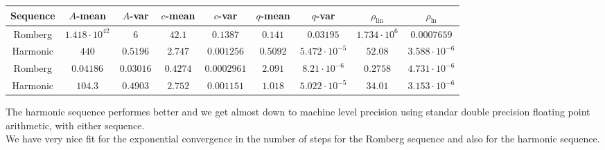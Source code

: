 \begin{table}[H]
    \centering
    \small
    \begin{tabular}{c||c|c|c|c|c|c|c|c}
Sequence & \(A\)-mean & \(A\)-var & \(c\)-mean & \(c\)-var & \(q\)-mean & \(q\)-var & \(\rho_{\operatorname{lin}}\) & \(\rho_{\ln}\)\\\hline
\rowcolor{red}
Romberg & \(1.418\cdot 10^{42}\) & \(6\) & \(42.1\) & \(0.1387\) & \(0.141\) & \(0.03195\) & \(1.734\cdot 10^6\) & \(0.0007659\) \\
\rowcolor{green}
Harmonic & \(440\) & \(0.5196\) & \(2.747\) & \(0.001256\) & \(0.5092\) & \(5.472\cdot 10^{-5}\) & \(52.08\) & \(3.588\cdot 10^{-6}\) \\
\rowcolor{green}
Romberg & \(0.04186\) & \(0.03016\) & \(0.4274\) & \(0.0002961\) & \(2.091\) & \(8.21\cdot 10^{-6}\) & \(0.2758\) & \(4.731\cdot 10^{-6}\) \\
\rowcolor{green}
Harmonic & \(104.3\) & \(0.4903\) & \(2.752\) & \(0.001151\) & \(1.018\) & \(5.022\cdot 10^{-5}\) & \(34.01\) & \(3.153\cdot 10^{-6}\) \\
    \end{tabular}
    \label{tab:my_label}
\end{table}

The harmonic sequence performes better and we get almost down to machine level precision using standar double precision floating point arithmetic, with either sequence.\\

We have very nice fit for the exponential convergence in the number of steps for the Romberg sequence and also for the harmonic sequence.

